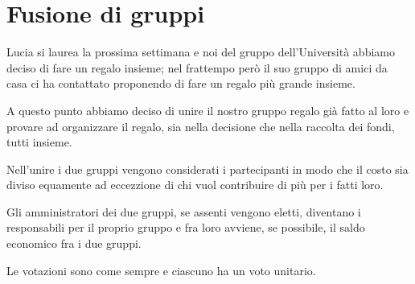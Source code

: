 \documentclass[10pt,a4paper]{article}
\begin{document}
	\section{Fusione di gruppi}
	
	Lucia si laurea la prossima settimana e noi del gruppo dell'Università abbiamo deciso di fare un regalo insieme; nel frattempo però il suo gruppo di amici da casa ci ha contattato proponendo di fare un regalo più grande insieme.
	
	A questo punto abbiamo deciso di unire il nostro gruppo regalo già fatto al loro e provare ad organizzare il regalo, sia nella decisione che nella raccolta dei fondi, tutti insieme.
	
	Nell'unire i due gruppi vengono considerati i partecipanti in modo che il costo sia diviso equamente ad eccezzione di chi vuol contribuire di più per i fatti loro.
	
	Gli amministratori dei due gruppi, se assenti vengono eletti, diventano i responsabili per il proprio gruppo e fra loro avviene, se possibile, il saldo economico fra i due gruppi.
	
	Le votazioni sono come sempre e ciascuno ha un voto unitario.
	
	
\end{document}
